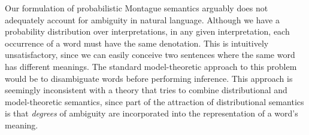 \documentclass{svmult}
\begin{document}
Our formulation of probabilistic Montague semantics arguably does not
adequately account for ambiguity in natural language. Although we have
a probability distribution over interpretations, in any given
interpretation, each occurrence of a word must have the same
denotation. This is intuitively unsatisfactory, since we can easily
conceive two sentences where the same word has different meanings. The
standard model-theoretic approach to this problem would be to
disambiguate words before performing inference. This approach is
seemingly inconsistent with a theory that tries to combine
distributional and model-theoretic semantics, since part of the
attraction of distributional semantics is that \emph{degrees} of
ambiguity are incorporated into the representation of a word's
meaning.


\end{document}
